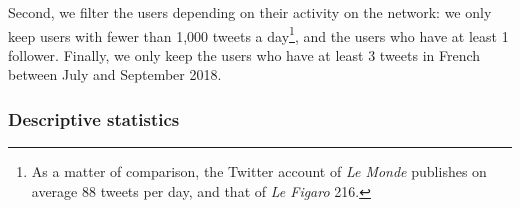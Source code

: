 Second, we filter the users depending on their activity on the network: we only keep users with fewer than 1,000 tweets a day\footnote{As a matter of comparison, the Twitter account of \textit{Le Monde} publishes on average 88 tweets per day, and that of \textit{Le Figaro} 216.}, and the users who have at least 1 follower. Finally, we only keep the users who have at least 3 tweets in French between July and September 2018.


\subsubsection{Descriptive statistics}

%
%
%
%	
%

